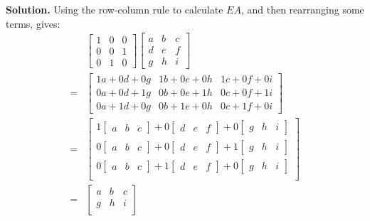 \documentclass[11pt, letterpaper]{report}
\newenvironment{book}{}{}
\begin{document}
\begin{book}
\textbf{Solution.} Using the row-column rule to calculate $EA$, and then rearranging some terms, gives:
\begin{align*}
&\begin{bmatrix}
1 & 0 & 0 \\
0 & 0 & 1 \\
0 & 1 & 0 
\end{bmatrix}\begin{bmatrix}
a & b & c \\
d & e & f \\
g & h & i
\end{bmatrix} \\
= &\begin{bmatrix}
1a + 0d + 0g & 1b + 0e + 0h & 1c + 0f + 0i \\
0a + 0d + 1g & 0b + 0e + 1h & 0c + 0f + 1i \\
0a + 1d + 0g & 0b + 1e + 0h & 0c + 1f + 0i 
\end{bmatrix} \\
= &\begin{bmatrix}
1 \begin{bmatrix}a & b & c\end{bmatrix} + 0 \begin{bmatrix}d & e & f\end{bmatrix} + 0\begin{bmatrix}
g & h & i
\end{bmatrix} \\
0 \begin{bmatrix}a & b & c\end{bmatrix} + 0 \begin{bmatrix}d & e & f\end{bmatrix} + 1\begin{bmatrix}
g & h & i
\end{bmatrix} \\
0 \begin{bmatrix}a & b & c\end{bmatrix} + 1 \begin{bmatrix}d & e & f\end{bmatrix} + 0\begin{bmatrix}
g & h & i
\end{bmatrix} \\
\end{bmatrix} \\
= &
\begin{bmatrix}
a & b & c \\
g & h & i \\

\end{bmatrix}
\end{align*}
\end{book}
\end{document}
